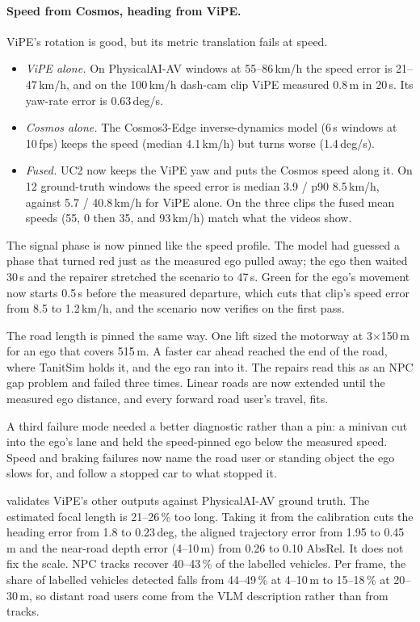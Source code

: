 \documentclass[10pt,a4paper]{article}
\begin{document}
\paragraph{Speed from Cosmos, heading from ViPE.} ViPE's rotation is good, but its metric translation fails at
speed.
\begin{itemize}[leftmargin=1.4em,itemsep=0pt]
\item \emph{ViPE alone.} On PhysicalAI-AV windows at 55--86\,km/h the speed error is 21--47\,km/h, and on the
  100\,km/h dash-cam clip ViPE measured 0.8\,m in 20\,s. Its yaw-rate error is 0.63\,deg/s.
\item \emph{Cosmos alone.} The Cosmos3-Edge inverse-dynamics model (6\,s windows at 10\,fps) keeps the speed
  (median 4.1\,km/h) but turns worse (1.4\,deg/s).
\item \emph{Fused.} UC2 now keeps the ViPE yaw and puts the Cosmos speed along it. On 12 ground-truth windows the
  speed error is median 3.9 / p90 8.5\,km/h, against 5.7 / 40.8\,km/h for ViPE alone. On the three clips the
  fused mean speeds (55, 0 then 35, and 93\,km/h) match what the videos show.
\end{itemize}
The signal phase is now pinned like the speed profile. The model had guessed a phase that turned red just as
the measured ego pulled away; the ego then waited 30\,s and the repairer stretched the scenario to 47\,s. Green
for the ego's movement now starts 0.5\,s before the measured departure, which cuts that clip's speed error from
8.5 to 1.2\,km/h, and the scenario now verifies on the first pass.

The road length is pinned the same way. One lift sized the motorway at 3$\times$150\,m for an ego that covers
515\,m. A faster car ahead reached the end of the road, where TanitSim holds it, and the ego ran into it. The
repairs read this as an NPC gap problem and failed three times. Linear roads are now extended until the measured
ego distance, and every forward road user's travel, fits.

A third failure mode needed a better diagnostic rather than a pin: a minivan cut into the ego's lane and held the
speed-pinned ego below the measured speed. Speed and braking failures now name the road user or standing object
the ego slows for, and follow a stopped car to what stopped it.

 validates ViPE's other outputs against PhysicalAI-AV ground truth. The estimated focal length
is 21--26\,\% too long. Taking it from the calibration cuts the heading error from 1.8 to 0.23\,deg, the aligned
trajectory error from 1.95 to 0.45\,m and the near-road depth error (4--10\,m) from 0.26 to 0.10 AbsRel. It
does not fix the scale. NPC tracks recover 40--43\,\% of the labelled vehicles. Per frame, the share of
labelled vehicles detected falls from 44--49\,\% at 4--10\,m to 15--18\,\% at 20--30\,m, so distant road users
come from the VLM description rather than from tracks.
\end{document}
